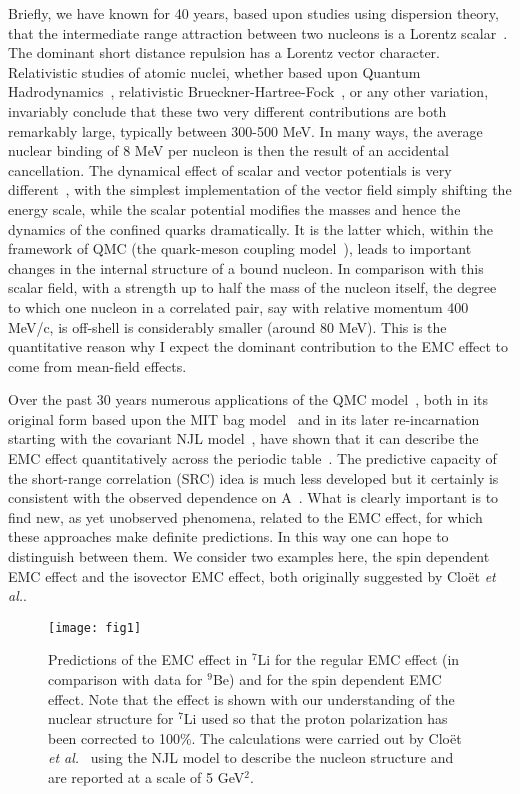 \documentclass{ws-ijmpe}
\begin{document}
Briefly, we have known for 40 years, based upon studies using dispersion theory, that the intermediate range attraction between two nucleons is a Lorentz scalar~\cite{Cottingham:1973wt}. The dominant short distance repulsion has a Lorentz vector character. Relativistic studies of atomic nuclei, whether based upon Quantum 
Hadrodynamics~\cite{Serot:1997xg}, relativistic Brueckner-Hartree-Fock~\cite{vanDalen:2004pn}, or any other variation, invariably conclude that these two very different contributions are both remarkably large, typically between 300-500 MeV. In many ways, the average nuclear binding of 8 MeV per nucleon is then the result of an accidental cancellation. The dynamical effect of scalar and vector potentials is very 
different~\cite{Guichon:1987jp,Thomas:2016bxx}, with the simplest implementation of the vector field simply shifting the energy scale, while the scalar potential modifies the masses and hence the dynamics of the confined quarks dramatically. It is the latter which, within the framework of QMC (the quark-meson coupling 
model~\cite{Guichon:1987jp,Guichon:1995ue,Saito:2005rv}), leads to important changes in the internal structure of a bound nucleon. In comparison with this  scalar field, with a strength up to half the mass of the nucleon itself, the degree to which one nucleon in a correlated pair, say with relative momentum 400 MeV/c, is off-shell is considerably smaller (around 80 MeV). This is the quantitative reason why I expect the dominant contribution to the EMC effect to come from  mean-field effects.

Over the past 30 years numerous applications of the QMC 
model~\cite{Saito:2005rv,Guichon:2008zz,Cloet:2015tha,Tsushima:1998qw}, both in its original form based upon the 
MIT bag model~\cite{Guichon:1987jp,Guichon:1995ue} and in its later re-incarnation starting with the covariant 
NJL model~\cite{Bentz:2001vc}, have shown that it can describe the EMC effect quantitatively across the periodic 
table~\cite{Thomas:1989vt,Saito:1992rm,Miller:2001tg,Mineo:2003vc,Cloet:2005rt,Cloet:2006bq,Cloet:2009qs}. The predictive capacity of the short-range correlation (SRC) idea is much less developed but it certainly is consistent with the observed dependence on A~\cite{Weinstein:2010rt,Hen:2016kwk}. What is clearly important is to find new, as yet unobserved phenomena, related to the EMC effect, for which these approaches make definite predictions. In this way one can hope to distinguish between them. We consider two examples here, the spin dependent EMC effect and the isovector EMC effect, both originally suggested by Clo\"et {\it et al.}.
%
\begin{figure}[th]
\centerline{\texttt{[image: fig1]}}
\caption{Predictions of the EMC effect in $^7$Li for the regular EMC effect (in comparison with data for $^9$Be) and for the spin dependent EMC effect. Note that the effect is shown with our understanding of the nuclear structure for $^7$Li used so that the proton polarization has been corrected to 100\%. The calculations were carried out by 
Clo\"et {\it et al.}~\cite{Cloet:2006bq} using the NJL model to describe the nucleon structure 
and are reported at a scale of 5 GeV$^2$.}
\label{fig:fig1}
\end{figure}
%
\end{document}
